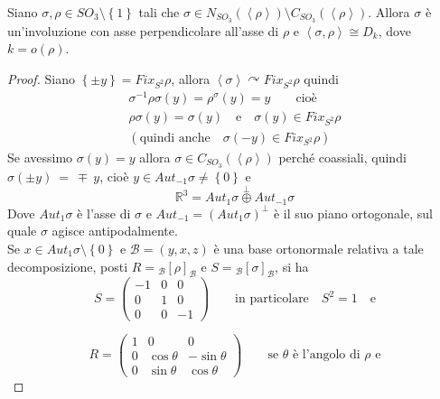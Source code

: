 \begin{oss} \label{oss:1}
Siano $\sigma,\rho\in SO_3\setminus\left\{1\right\}$ tali che $\sigma\in N_{SO_3}(\left<\rho\right>)\setminus C_{SO_3}(\left<\rho\right>)$. Allora $\sigma$ \`e un'involuzione con asse perpendicolare all'asse di $\rho$ e $\left<\sigma,\rho\right>\cong D_k$, dove $k=o(\rho)$.
\end{oss}
\begin{proof}
Siano $\left\{\pm y\right\}=Fix_{S^2}\rho$, allora $\left<\sigma\right>\curvearrowright Fix_{S^2}\rho$ quindi
\begin{gather*}
\sigma^{-1}\rho\sigma(y)=\rho^\sigma(y)=y\qquad\text{cio\`e}\\
\rho\sigma(y)=\sigma(y)\quad\text{e}\quad \sigma(y)\in Fix_{S^2}\rho\\
(\text{quindi anche}\quad \sigma(-y)\in Fix_{S^2}\rho)
\end{gather*}
Se avessimo $\sigma(y)=y$ allora $\sigma\in C_{SO_3}(\left<\rho\right>)$ perch\'e coassiali, quindi $\sigma(\pm y)~=~\mp~y$, cio\`e
$y\in Aut_{-1}\sigma\neq\left\{0\right\}$ e
\begin{equation*}
\mathbb{R}^3=Aut_1\sigma\overset{\scriptscriptstyle{\bot}}\oplus Aut_{-1}\sigma
\end{equation*}
Dove $Aut_1\sigma$ \`e l'asse di $\sigma$ e $Aut_{-1}=(Aut_1\sigma)^\bot$ \`e il suo piano ortogonale, sul quale $\sigma$ agisce antipodalmente.\\
Se $x\in Aut_1\sigma\setminus\left\{0\right\}$ e $\mathcal{B}=\left(y,x,z\right)$ \`e una base ortonormale relativa a tale decomposizione,
posti $R={}_\mathcal{B}\!\left[\rho\right]_\mathcal{B}$	e $S={}_\mathcal{B}\!\left[\sigma\right]_\mathcal{B}$,		%
si ha 
\begin{equation*}
S=\left(\begin{array}{ccc}
-1 & 0 & 0\\
0 & 1 & 0\\
0 & 0 & -1
\end{array}\right)
\qquad\text{in particolare}\quad S^2=1\quad\text{e}
\end{equation*}

\begin{equation*}
R=\left(\begin{array}{ccc}
1 & 0 & 0\\
0 & \cos{\theta} & -\sin{\theta}\\
0 & \sin{\theta} & \cos{\theta}
\end{array}\right)
\qquad\text{se }\theta\text{ \`e l'angolo di }\rho\text{ e}
\end{equation*}



\end{proof}

